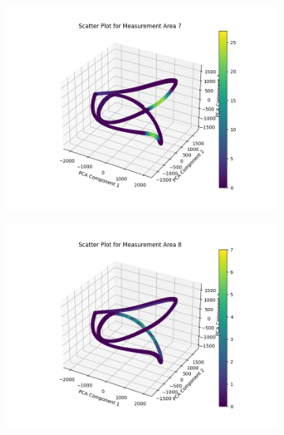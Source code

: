 \begin{itemize}
\begin{figure}[H]
\begin{subfigure}{0.3\textwidth}
        \includegraphics[width=\linewidth]
        {images/task5_2_7.png}
        \label{task5_2_7}
    \end{subfigure}
    \begin{subfigure}{0.3\textwidth}
        \includegraphics[width=\linewidth]
        {images/task5_2_8.png}
        \label{task5_2_8}
    \end{subfigure}
    \begin{subfigure}{0.3\textwidth}

\end{subfigure}
\end{figure}
\end{itemize}
